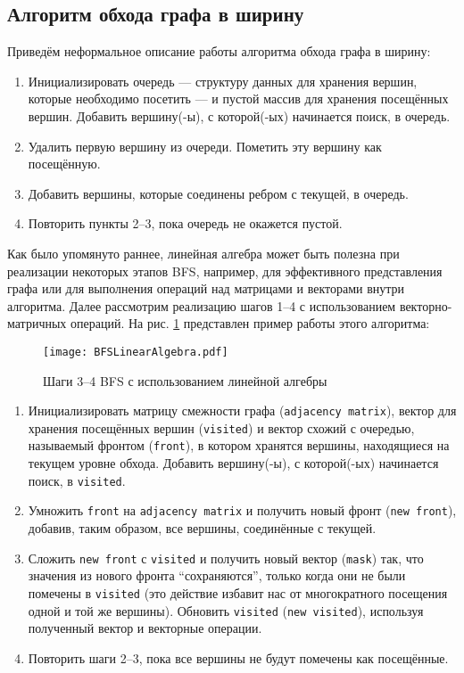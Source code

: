 \subsection{Алгоритм обхода графа в ширину}

Приведём неформальное описание работы алгоритма обхода графа в ширину:

\begin{enumerate}
    \item Инициализировать очередь --- структуру данных для хранения вершин, которые необходимо посетить --- и пустой массив для хранения посещённых вершин. Добавить вершину(-ы), с которой(-ых) начинается поиск, в очередь.
    \item Удалить первую вершину из очереди. Пометить эту вершину как посещённую.
    \item Добавить вершины, которые соединены ребром с текущей, в очередь.
    \item Повторить пункты 2--3, пока очередь не окажется пустой.
\end{enumerate}

Как было упомянуто раннее, линейная алгебра может быть полезна при реализации некоторых этапов BFS, например, для эффективного представления графа или для выполнения операций над матрицами и векторами внутри алгоритма. Далее рассмотрим реализацию шагов 1--4 с использованием векторно-матричных операций. На рис. \ref{fig:bfs} представлен пример работы этого алгоритма:

\begin{figure}
    \centering
    \texttt{[image: BFSLinearAlgebra.pdf]}
    \caption{Шаги 3--4 BFS с использованием линейной алгебры}
    \label{fig:bfs}
\end{figure}

\begin{enumerate}
    \item Инициализировать матрицу смежности графа (\texttt{ad\-ja\-cen\-cy mat\-rix}), вектор для хранения посещённых вершин (\texttt{visited}) и вектор схожий с очередью, называемый фронтом (\texttt{front}), в котором хранятся вершины, находящиеся на текущем уровне обхода. Добавить вершину(-ы), с которой(-ых) начинается поиск, в \texttt{visited}.
    \item Умножить \texttt{front} на \texttt{adjacency matrix} и получить новый фронт  (\texttt{new front}), добавив, таким образом, все вершины, соединённые с текущей. 
    \item Сложить \texttt{new front} с \texttt{visited} и получить новый вектор (\texttt{mask}) так, что значения из нового фронта \enquote{сохраняются}, только когда они не были помечены в \texttt{visited} (это действие избавит нас от многократного посещения одной и той же вершины). Обновить \texttt{visited} (\texttt{new visited}), используя полученный вектор и векторные операции.
    \item Повторить шаги 2--3, пока все вершины не будут помечены как посещённые.
\end{enumerate}

